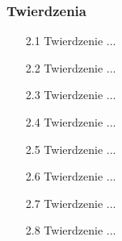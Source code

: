 \subsubsection{Twierdzenia}	
\begin{enumerate}	
    \item [2.1] Twierdzenie ...
    \item [2.2] Twierdzenie ...
    \item [2.3] Twierdzenie ...
    \item [2.4] Twierdzenie ...
    \item [2.5] Twierdzenie ...
    \item [2.6] Twierdzenie ...
    \item [2.7] Twierdzenie ...
    \item [2.8] Twierdzenie ...

\end{enumerate}
